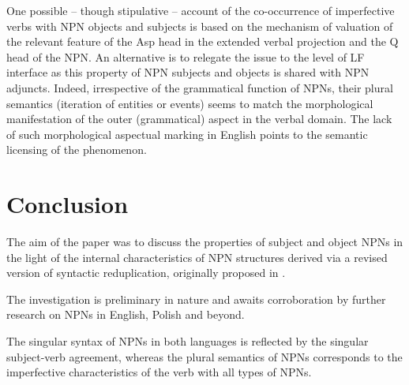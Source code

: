 \documentclass[output=paper]{langscibook}
\begin{document}
\ea \label{psk:ex:key:24} 
\z
\z

\noindent One possible – though stipulative – account of the co-occurrence of imperfective verbs with NPN objects and subjects is based on the mechanism of valuation of the relevant feature of the Asp head in the extended verbal projection and the Q head of the NPN. An alternative is to relegate the issue to the level of LF interface as this property of NPN subjects and objects is shared with NPN adjuncts. Indeed, irrespective of the grammatical function of NPNs, their plural semantics (iteration of entities or events) seems to match the morphological manifestation of the outer (grammatical) aspect in the verbal domain. The lack of such morphological aspectual marking in English points to the semantic licensing of the phenomenon.

\section{Conclusion}\label{psk:sec:sec4}

The aim of the paper was to discuss the properties of subject and object NPNs in the light of the internal characteristics of NPN structures derived via a revised version of syntactic reduplication, originally proposed in \cite{Travis2001,Travis2003}.

The investigation is preliminary in nature and awaits corroboration by further research on NPNs in English, Polish and beyond.

The singular syntax of NPNs in both languages is reflected by the singular subject-verb agreement, whereas the plural semantics of NPNs corresponds to the imperfective characteristics of the verb with all types of NPNs.
\end{document}
